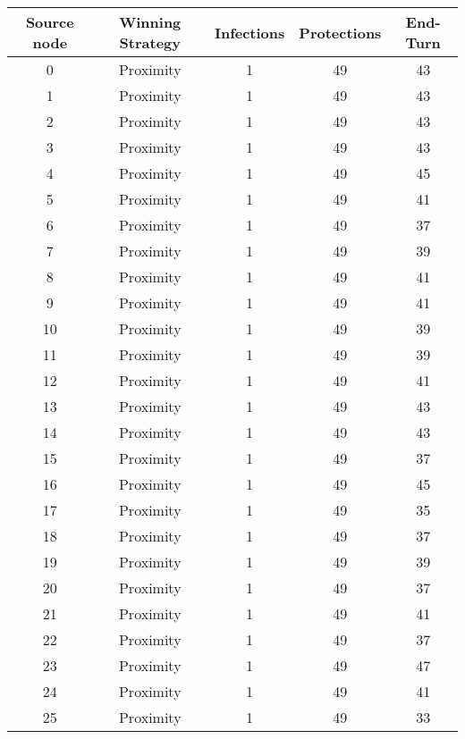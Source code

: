 \documentclass[results.tex]{subfiles}
\begin{document}
\begin{center}
  \begin{tabular}{| c || c | c | c | c |}
    \hline
    {\bfseries Source node} & {\bfseries Winning Strategy} & {\bfseries Infections} & {\bfseries Protections} & {\bfseries End-Turn} \\  %
    \hline\hline
    0 & Proximity & 1 & 49 & 43 \\ 
    \hline
    1 & Proximity & 1 & 49 & 43 \\ 
    \hline
    2 & Proximity & 1 & 49 & 43 \\ 
    \hline
    3 & Proximity & 1 & 49 & 43 \\ 
    \hline
    4 & Proximity & 1 & 49 & 45 \\ 
    \hline
    5 & Proximity & 1 & 49 & 41 \\ 
    \hline
    6 & Proximity & 1 & 49 & 37 \\ 
    \hline
    7 & Proximity & 1 & 49 & 39 \\ 
    \hline
    8 & Proximity & 1 & 49 & 41 \\ 
    \hline
    9 & Proximity & 1 & 49 & 41 \\ 
    \hline
    10 & Proximity & 1 & 49 & 39 \\ 
    \hline
    11 & Proximity & 1 & 49 & 39 \\ 
    \hline
    12 & Proximity & 1 & 49 & 41 \\ 
    \hline
    13 & Proximity & 1 & 49 & 43 \\ 
    \hline
    14 & Proximity & 1 & 49 & 43 \\ 
    \hline
    15 & Proximity & 1 & 49 & 37 \\ 
    \hline
    16 & Proximity & 1 & 49 & 45 \\ 
    \hline
    17 & Proximity & 1 & 49 & 35 \\ 
    \hline
    18 & Proximity & 1 & 49 & 37 \\ 
    \hline
    19 & Proximity & 1 & 49 & 39 \\ 
    \hline
    20 & Proximity & 1 & 49 & 37 \\ 
    \hline
    21 & Proximity & 1 & 49 & 41 \\ 
    \hline
    22 & Proximity & 1 & 49 & 37 \\ 
    \hline
    23 & Proximity & 1 & 49 & 47 \\ 
    \hline
    24 & Proximity & 1 & 49 & 41 \\ 
    \hline
    25 & Proximity & 1 & 49 & 33 \\ 

\end{tabular}
\end{center}
\end{document}
